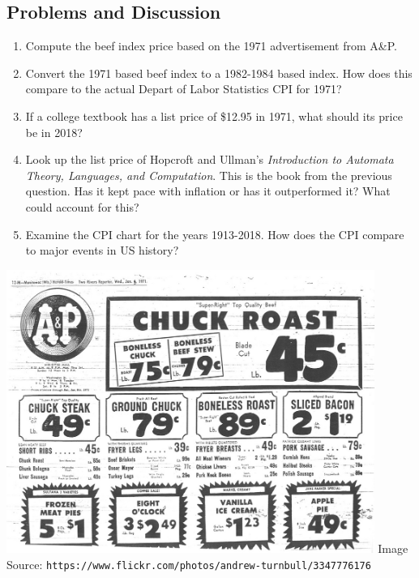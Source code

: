 \documentclass{article}
\begin{document}
\subsection*{Problems and Discussion}
\begin{enumerate}
\item Compute the beef index price based on the 1971 advertisement from A\&P.  
\item Convert the 1971 based beef index to a 1982-1984 based index.  How does this compare to the actual Depart of Labor Statistics CPI for 1971?
\item If a college textbook has a list price of \$12.95 in 1971, what should its price be in 2018?
\item Look up the list price of Hopcroft and Ullman's {\em Introduction to Automata Theory, Languages, and Computation}.  This is the book from the previous question.  Has it kept pace with inflation or has it outperformed it?  What could account for this?
\item Examine the CPI chart for the years 1913-2018.  How does the CPI compare to major events in US history?
\end{enumerate}

\includegraphics[width=0.9\textwidth]{apfood}\newline
Image Source: {\tt https://www.flickr.com/photos/andrew-turnbull/3347776176}


\end{document}
